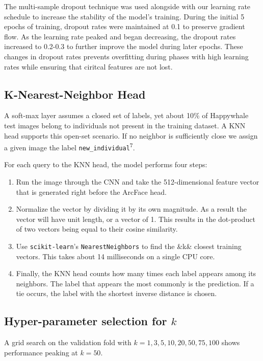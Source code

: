 \documentclass[twocolumn]{article}
\begin{document}
The multi-sample dropout technique was used alongside with our learning rate schedule to increase the stability of the model's training. During the initial 5 epochs of training, dropout rates were maintained at 0.1 to preserve gradient flow. As the learning rate peaked and began decreasing, the dropout rates increased to 0.2-0.3 to further improve the model during later epochs. These changes in dropout rates prevents overfitting during phases with high learning rates while ensuring that ciritcal features are not lost.

\subsection{K-Nearest-Neighbor Head}

A soft-max layer assumes a closed set of labels, yet about 10\% of Happywhale test images belong to individuals not present in the training dataset. A KNN head supports this open-set scenario. If no neighbor is sufficiently close we assign a given image the label \texttt{new_individual}\textsuperscript{7}.

For each query to the KNN head, the model performs four steps:
\begin{enumerate}
    \item Run the image through the CNN and take the 512-dimensional feature vector that is generated right before the ArcFace head.
    \item Normalize the vector by dividing it by its own magnitude. As a result the vector will have unit length, or a vector of 1. This results in the dot-product of two vectors being equal to their cosine similarity.
    \item Use \texttt{scikit-learn}'s \texttt{NearestNeighbors} to find the &k& closest training vectors. This takes about 14 milliseconds on a single CPU core.
    \item Finally, the KNN head counts how many times each label appears among its neighbors.  The label that appears the most commonly is the prediction. If a tie occurs, the label with the shortest inverse distance is chosen.\\
\end{enumerate}

\subsection{Hyper-parameter selection for $k$}

A grid search on the validation fold with $k\!=\!1,3,5,10,20,50,75,100$ shows performance peaking at $k=50$. 
\end{document}
